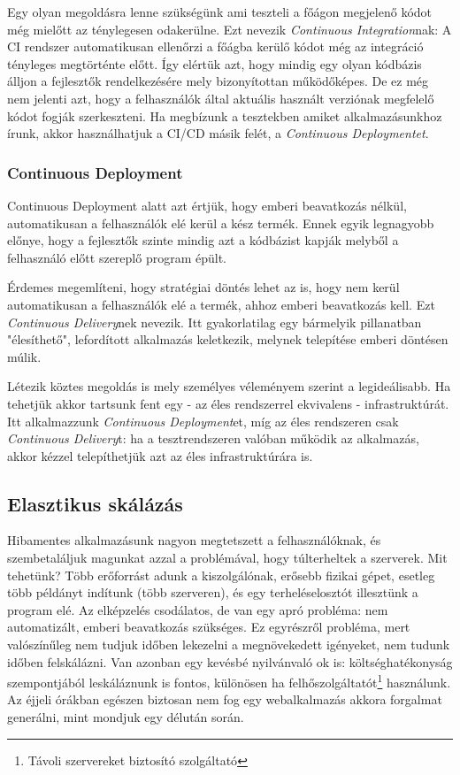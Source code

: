 Egy olyan megoldásra lenne szükségünk ami teszteli a főágon megjelenő kódot még mielőtt az ténylegesen odakerülne. Ezt nevezik \textit{Continuous Integration}nak: A CI rendszer automatikusan ellenőrzi a főágba kerülő kódot még az integráció tényleges megtörténte előtt.\cite{CI_Atlassian} Így elértük azt, hogy mindig egy olyan kódbázis álljon a fejlesztők rendelkezésére mely bizonyítottan működőképes. De ez még nem jelenti azt, hogy a felhasználók által aktuális használt verziónak megfelelő kódot fogják szerkeszteni. Ha megbízunk a tesztekben amiket alkalmazásunkhoz írunk, akkor használhatjuk a CI/CD másik felét, a \textit{Continuous Deploymentet}.
\subsubsection{Continuous Deployment}
Continuous Deployment alatt azt értjük, hogy emberi beavatkozás nélkül, automatikusan a felhasználók elé kerül a kész termék. Ennek egyik legnagyobb előnye, hogy a fejlesztők szinte mindig azt a kódbázist kapják melyből a felhasználó előtt szereplő program épült.\cite{CD_Atlassian}

Érdemes megemlíteni, hogy stratégiai döntés lehet az is, hogy nem kerül automatikusan a felhasználók elé a termék, ahhoz emberi beavatkozás kell. Ezt \textit{Continuous Delivery}nek nevezik. Itt gyakorlatilag egy bármelyik pillanatban "élesíthető", lefordított alkalmazás keletkezik, melynek telepítése emberi döntésen múlik.

Létezik köztes megoldás is mely személyes véleményem szerint a legideálisabb. Ha tehetjük akkor tartsunk fent egy - az éles rendszerrel ekvivalens - infrastruktúrát. Itt alkalmazzunk \textit{Continuous Deployment}et, míg az éles rendszeren csak \textit{Continuous Delivery}t: ha a tesztrendszeren valóban működik az alkalmazás, akkor kézzel telepíthetjük azt az éles infrastruktúrára is.
\subsection{Elasztikus skálázás}
Hibamentes alkalmazásunk nagyon megtetszett a felhasználóknak, és szembetaláljuk magunkat azzal a problémával, hogy túlterheltek a szerverek. Mit tehetünk? Több erőforrást adunk a kiszolgálónak, erősebb fizikai gépet, esetleg több példányt indítunk (több szerveren), és egy terheléselosztót illesztünk a program elé. Az elképzelés csodálatos, de van egy apró probléma: nem automatizált, emberi beavatkozás szükséges. Ez egyrészről probléma, mert valószínűleg nem tudjuk időben lekezelni a megnövekedett igényeket, nem tudunk időben felskálázni. Van azonban egy kevésbé nyilvánvaló ok is: költséghatékonyság szempontjából leskáláznunk is fontos, különösen ha felhőszolgáltatót\footnote{Távoli szervereket biztosító szolgáltató} használunk. Az éjjeli órákban egészen biztosan nem fog egy webalkalmazás akkora forgalmat generálni, mint mondjuk egy délután során.


